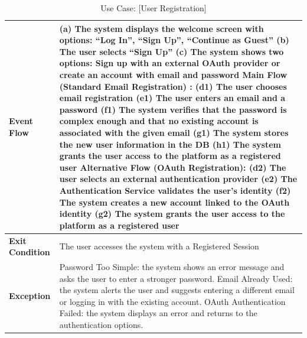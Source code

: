 \begin{table}[H]
\begin{tabularx}{\textwidth}{|l|X|}
        \textbf{Event Flow} & 
        (a) The system displays the welcome screen with options: “Log In”, “Sign Up”, “Continue as Guest” \newline
        (b) The user selects “Sign Up” \newline 
        (c) The system shows two options: Sign up with an external OAuth provider or create an account with email and password \newline \newline
        Main Flow (Standard Email Registration) :\newline
        (d1) The user chooses email registration\newline 
        (e1) The user enters an email and a password\newline   
        (f1) The system verifies that the password is complex enough and that no existing account is associated with the given email\newline 
        (g1) The system stores the new user information in the DB\newline                                         
        (h1) The system grants the user access to the platform as a registered user\newline \newline
        Alternative Flow (OAuth Registration):\newline         
        (d2) The user selects an external authentication provider \newline 
        (e2) The Authentication Service validates the user’s identity \newline 
        (f2) The system creates a new account linked to the OAuth identity \newline                                        
        (g2) The system grants the user access to the platform as a registered user 
        \\ \hline
        
        \textbf{Exit Condition} & The user accesses the system with a Registered Session \\ \hline
        
        \textbf{Exception} & 
        Password Too Simple: the system shows an error message and asks the user to enter a stronger password.\newline 
        Email Already Used: the system alerts the user and suggests entering a different email or logging in with the existing account.\newline 
        OAuth Authentication Failed: the system displays an error and returns to the authentication options. \\ \hline
        
    \end{tabularx}
    
    \caption{Use Case: [User Registration]}
\end{table}

